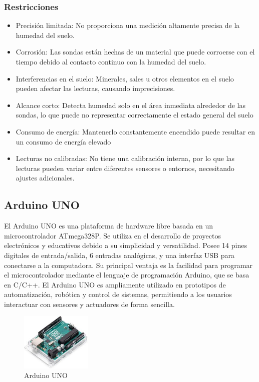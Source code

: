 \documentclass[conference]{IEEEtran}
\begin{document}
	\subsubsection{Restricciones}
	\begin{itemize}
		\item Precisión limitada: No proporciona una medición altamente precisa de la humedad del suelo. 
		\item Corrosión: Las sondas están hechas de un material que puede corroerse con el tiempo debido al contacto continuo con la humedad del suelo.
		\item Interferencias en el suelo: Minerales, sales u otros elementos en el suelo pueden afectar las lecturas, causando imprecisiones.
		\item Alcance corto: Detecta humedad solo en el área inmediata alrededor de las sondas, lo que puede no representar correctamente el estado general del suelo
		\item Consumo de energía: Mantenerlo constantemente encendido puede resultar en un consumo de energía elevado
		\item Lecturas no calibradas: No tiene una calibración interna, por lo que las lecturas pueden variar entre diferentes sensores o entornos, necesitando ajustes adicionales.
	\end{itemize}
	
	\subsection{Arduino UNO}
	El Arduino UNO es una plataforma de hardware libre basada en un microcontrolador ATmega328P. Se utiliza en el desarrollo de proyectos electrónicos y educativos debido a su simplicidad y versatilidad. Posee 14 pines digitales de entrada/salida, 6 entradas analógicas, y una interfaz USB para conectarse a la computadora. Su principal ventaja es la facilidad para programar el microcontrolador mediante el lenguaje de programación Arduino, que se basa en C/C++. El Arduino UNO es ampliamente utilizado en prototipos de automatización, robótica y control de sistemas, permitiendo a los usuarios interactuar con sensores y actuadores de forma sencilla.
	
	\begin{figure}[h]
		\centering
		\includegraphics[width=0.3\textwidth]{media/arduino-uno.jpg}
		\caption{Arduino UNO}
		\label{fig:arduino-uno}
	\end{figure}
	
\end{document}
